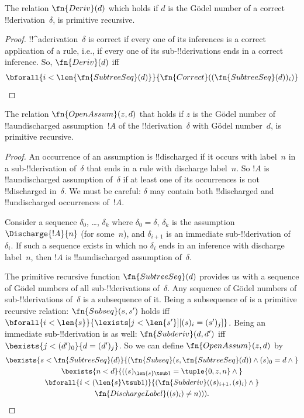 \documentclass[../../../include/open-logic-section]{subfiles}
\begin{document}
\begin{prop}
  The relation $\fn{Deriv}(d)$ which holds if $d$ is the G\"odel
  number of a correct !!{derivation}~$\delta$, is primitive recursive.
\end{prop}

\begin{proof}
  !!^a{derivation}~$\delta$ is correct if every one of its inferences
  is a correct application of a rule, i.e., if every one of its
  sub-!!{derivation}s ends in a correct inference. So, $\fn{Deriv}(d)$
  iff
  \[
  \bforall{i<\len{\fn{SubtreeSeq}(d)}}{\fn{Correct}((\fn{SubtreeSeq}(d))_i)}
  \]
\end{proof}

\begin{prop}
   The relation $\fn{OpenAssum}(z, d)$ that
  holds if $z$ is the G\"odel number of !!a{undischarged} assumption~$!A$
  of the !!{derivation}~$\delta$ with G\"odel number~$d$, is primitive
  recursive.
\end{prop}

\begin{proof}
  An occurrence of an assumption is !!{discharged} if it occurs with
  label~$n$ in a sub-!!{derivation} of~$\delta$ that ends in a rule
  with discharge label~$n$. So $!A$ is !!a{undischarged} assumption
  of~$\delta$ if at least one of its occurrences is not !!{discharged}
  in~$\delta$. We must be careful: $\delta$ may contain both
  !!{discharged} and !!{undischarged} occurrences of~$!A$.

  Consider a sequence $\delta_0$, \dots, $\delta_k$ where $\delta_0 =
  \delta$, $\delta_k$ is the assumption $\Discharge{!A}{n}$
  (for some~$n$), and $\delta_{i+1}$ is an immediate sub-!!{derivation}
  of~$\delta_i$. If such a sequence exists in which no $\delta_i$
  ends in an inference with discharge label~$n$, then $!A$ is
  !!a{undischarged} assumption of~$\delta$.

  The primitive recursive function $\fn{SubtreeSeq}(d)$ provides us
  with a sequence of G\"odel numbers of all sub-!!{derivation}s
  of~$\delta$. Any sequence of G\"odel numbers of sub-!!{derivation}s
  of~$\delta$ is a subsequence of it. Being a subsequence of is a
  primitive recursive relation: $\fn{Subseq}(s, s')$ holds iff
  $\bforall{i<\len{s}}{\lexists[j<\len{s'}][(s)_i = (s')_j]}$. Being an
  immediate sub-!!{derivation} is as well: $\fn{Subderiv}(d, d')$ iff
  $\bexists{j<(d')_0}{d = (d')_j}$. So we can define
  $\fn{OpenAssum}(z, d)$ by
  \begin{multline*}
    \bexists{s<\fn{SubtreeSeq}(d)}{(\fn{Subseq}(s, \fn{SubtreeSeq}(d))
      \land (s)_0 = d \land {}} \\
    \bexists{n<d}{((s)_{\len{s} \tsub 1} = \tuple{0, z, n} \land {}}\\
      \bforall{i<(\len{s} \tsub 1)}{(\fn{Subderiv}((s)_{i+1}, (s)_i) \land {}}\\
      \fn{DischargeLabel}((s)_i) \neq n))).
  \end{multline*}
\end{proof}
\end{document}
